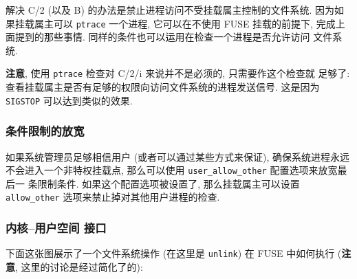 \documentclass[nofonts, titlepage]{ctexart}
\begin{document}
解决 C/2 (以及 B) 的办法是禁止进程访问不受挂载属主控制的文件系统.
因为如果挂载属主可以 \texttt{ptrace} 一个进程, 它可以在不使用 FUSE
挂载的前提下, 完成上面提到的那些事情.
同样的条件也可以运用在检查一个进程是否允许访问 文件系统.

\textbf{注意}, 使用 \texttt{ptrace} 检查对 C/2/i 来说并不是必须的,
只需要作这个检查就 足够了:
查看挂载属主是否有足够的权限向访问文件系统的进程发送信号. 这是因为
\texttt{SIGSTOP} 可以达到类似的效果.

\subsubsection{条件限制的放宽}
\label{subsub:i_think_these_limitations_are_unacceptable}

如果系统管理员足够相信用户 (或者可以通过某些方式来保证),
确保系统进程永远 不会进入一个非特权挂载点, 那么可以使用
\texttt{user\_allow\_other} 配置选项来放宽最后一 条限制条件.
如果这个配置选项被设置了, 那么挂载属主可以设置 \texttt{allow\_other}
选项来禁止掉对其他用户进程的检查.

\subsubsection{内核--用户空间
接口}\label{ux5185ux6838ux7528ux6237ux7a7aux95f4-ux63a5ux53e3}

下面这张图展示了一个文件系统操作 (在这里是 \texttt{unlink}) 在 FUSE
中如何执行 ({\textbf{注意}, 这里的讨论是经过简化了的}):
\end{document}
